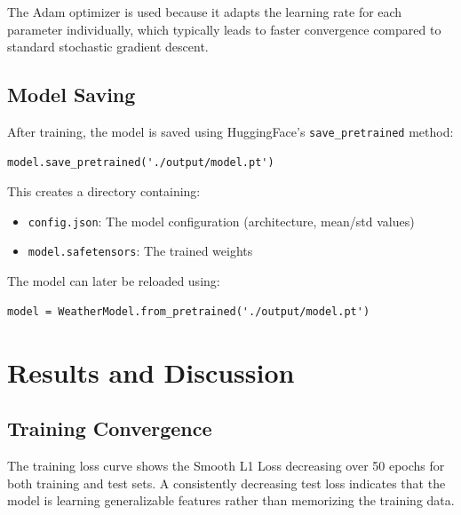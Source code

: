 \documentclass[12pt, a4paper]{report}
\begin{document}
The Adam optimizer is used because it adapts the learning rate for each parameter individually, which typically leads to faster convergence compared to standard stochastic gradient descent.

\section{Model Saving}

After training, the model is saved using HuggingFace's \texttt{save\_pretrained} method:
\begin{verbatim}
model.save_pretrained('./output/model.pt')
\end{verbatim}

This creates a directory containing:
\begin{itemize}
    \item \texttt{config.json}: The model configuration (architecture, mean/std values)
    \item \texttt{model.safetensors}: The trained weights
\end{itemize}

The model can later be reloaded using:
\begin{verbatim}
model = WeatherModel.from_pretrained('./output/model.pt')
\end{verbatim}

\chapter{Results and Discussion}

\section{Training Convergence}

The training loss curve shows the Smooth L1 Loss decreasing over 50 epochs for both training and test sets. A consistently decreasing test loss indicates that the model is learning generalizable features rather than memorizing the training data.

\end{document}
